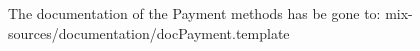 The documentation of the Payment methods has be gone to: mix-sources/documentation/docPayment.template